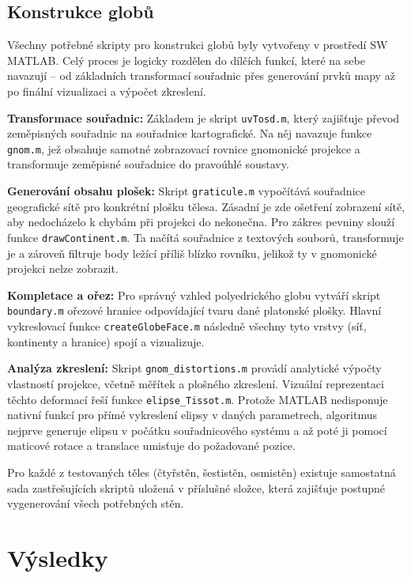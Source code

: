 \subsection{Konstrukce globů}
Všechny potřebné skripty pro konstrukci globů byly vytvořeny v prostředí SW MATLAB. Celý proces je logicky rozdělen do dílčích funkcí, které na sebe navazují – od základních transformací souřadnic přes generování prvků mapy až po finální vizualizaci a výpočet zkreslení.

\textbf{Transformace souřadnic:} Základem je skript \lstinline{uvTosd.m}, který zajišťuje převod zeměpisných souřadnic na souřadnice kartografické. Na něj navazuje funkce \lstinline{gnom.m}, jež obsahuje samotné zobrazovací rovnice gnomonické projekce a transformuje zeměpisné souřadnice do pravoúhlé soustavy.

\textbf{Generování obsahu plošek:} Skript \lstinline{graticule.m} vypočítává souřadnice geografické sítě pro konkrétní plošku tělesa. Zásadní je zde  ošetření zobrazení sítě, aby nedocházelo k chybám při projekci do nekonečna. Pro zákres pevniny slouží funkce \lstinline{drawContinent.m}. Ta načítá souřadnice z textových souborů, transformuje je a zároveň filtruje body ležící příliš blízko rovníku, jelikož ty v gnomonické projekci nelze zobrazit.

\textbf{Kompletace a ořez:} Pro správný vzhled polyedrického globu vytváří skript \lstinline{boundary.m} ořezové hranice odpovídající tvaru dané platonské plošky. Hlavní vykreslovací funkce \lstinline{createGlobeFace.m} následně všechny tyto vrstvy (síť, kontinenty a hranice) spojí a vizualizuje.

\textbf{Analýza zkreslení:} Skript \lstinline{gnom_distortions.m} provádí analytické výpočty vlastností projekce, včetně měřítek a plošného zkreslení. Vizuální reprezentaci těchto deformací řeší funkce \lstinline{elipse_Tissot.m}. Protože MATLAB nedisponuje nativní funkcí pro přímé vykreslení elipsy v daných parametrech, algoritmus nejprve generuje elipsu v počátku souřadnicového systému a až poté ji pomocí maticové rotace a translace umisťuje do požadované pozice.

Pro každé z testovaných těles (čtyřstěn, šestistěn, osmistěn) existuje samostatná sada zastřešujících skriptů uložená v příslušné složce, která zajišťuje postupné vygenerování všech potřebných stěn.



\newpage
\section{Výsledky}

